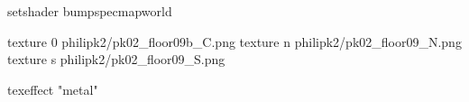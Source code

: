 setshader bumpspecmapworld

texture 0 philipk2/pk02_floor09b_C.png
texture n philipk2/pk02_floor09_N.png
texture s philipk2/pk02_floor09_S.png

texeffect "metal"
